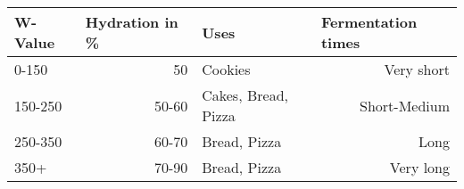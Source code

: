 


\begin{tabular}{|l|r|l|r|}
\hline
\textbf{W-Value} & \multicolumn{1}{l|}{\textbf{Hydration in \%}} & \textbf{Uses}       & \multicolumn{1}{l|}{\textbf{Fermentation times}} \\ \hline
0-150            & 50                                            & Cookies             & Very short                                       \\ \hline
150-250          & 50-60                                         & Cakes, Bread, Pizza & Short-Medium                                     \\ \hline
250-350          & 60-70                                         & Bread, Pizza        & Long                                             \\ \hline
350+             & 70-90                                         & Bread, Pizza        & Very long                                        \\ \hline
\end{tabular}

